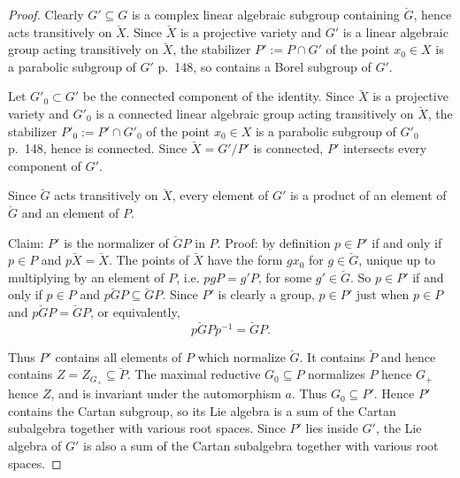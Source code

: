 \documentclass[a4paper,10pt]{amsart}
\theoremstyle{remark}
\begin{document}
\begin{proof}
Clearly \(G'\subseteq G\) is a complex linear algebraic subgroup containing \(\breve{G}\), hence acts transitively on \(\breve{X}\).
Since \(\breve{X}\) is a projective variety and \(G'\) is a linear algebraic group acting transitively on \(\breve{X}\), the stabilizer \(P':=P\cap G'\) of the point \(x_0\in X\) is a parabolic subgroup of \(G'\) \cite{Borel:1991} p.~148, so contains a Borel subgroup of \(G'\).

Let \(G'_0\subset G'\) be the connected component of the identity.
Since \(\breve{X}\) is a projective variety and \(G'_0\) is a connected linear algebraic group acting transitively on \(\breve{X}\), the stabilizer \(P'_0:=P'\cap G'_0\) of the point \(x_0\in X\) is a parabolic subgroup of \(G'_0\) \cite{Borel:1991} p.~148, hence is connected.
Since \(\breve{X}=G'/P'\) is connected, \(P'\) intersects every component of \(G'\).

Since \(\breve{G}\) acts transitively on \(\breve{X}\), every element of \(G'\) is a product of an element of \(\breve{G}\) and an element of \(P\).

Claim: \(P'\) is the normalizer of \(\breve{G}P\) in \(P\).
Proof: by definition \(p\in P'\) if and only if \(p\in P\) and \(p\breve{X}=\breve{X}\).
The points of \(\breve{X}\) have the form \(gx_0\) for \(g\in\breve{G}\), unique up to multiplying by an element of \(P\), i.e. \(pgP=g'P\), for some \(g'\in\breve{G}\).
So \(p\in P'\) if and only if \(p\in P\) and \(p\breve{G}P\subseteq\breve{G}P\).
Since \(P'\) is clearly a group, \(p\in P'\) just when \(p\in P\) and \(p\breve{G}P=\breve{G}P\), or equivalently, 
\[
p\breve{G}Pp^{-1}=\breve{G}P.
\]

Thus \(P'\) contains all elements of \(P\) which normalize \(\breve{G}\).
It contains \(\breve{P}\) and hence contains \(Z=Z_{G_+}\subseteq\breve{P}\).
The maximal reductive \(G_0\subseteq P\) normalizes \(P\) hence \(G_+\) hence \(Z\), and is invariant under the automorphism \(a\).
Thus \(G_0\subseteq P'\).
Hence \(P'\) contains the Cartan subgroup, so its Lie algebra is a sum of the Cartan subalgebra together with various root spaces.
Since \(P'\) lies inside \(G'\), the Lie algebra of \(G'\) is also a sum of the Cartan subalgebra together with various root spaces.


\end{proof}
\end{document}
